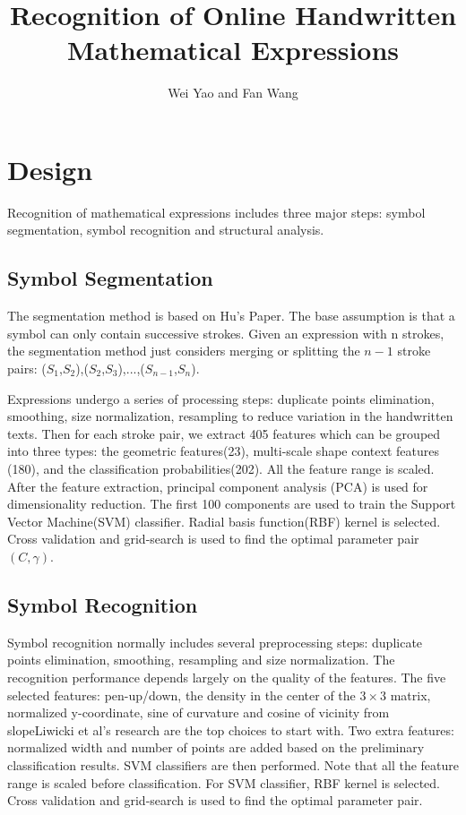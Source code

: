 \documentclass[]{spie}  %
\title{Recognition of Online Handwritten Mathematical Expressions}
\author{Wei Yao and Fan Wang
}
\begin{document}
\maketitle


\section{Design}

Recognition of mathematical expressions includes three major steps: symbol segmentation, symbol recognition and structural analysis.

\subsection{Symbol Segmentation}

The segmentation method is based on Hu's Paper\cite{Lei2013}. 
The base assumption is that a symbol can only contain successive strokes. 
Given an expression with n strokes, the segmentation method just considers merging or 
splitting the $n-1$ stroke pairs: ($S_1$,$S_2$),($S_2$,$S_3$),...,($S_{n-1}$,$S_{n}$).

Expressions  undergo a series of processing steps: duplicate points elimination, smoothing, 
size normalization, resampling to reduce variation in the handwritten 
texts\cite{Lei2011}\cite{Lei2013}. 
Then for each stroke pair, we extract 405 features which can be grouped into three types: the geometric features(23), multi-scale shape context features (180), and the classification probabilities(202). All the feature range is scaled. After the feature extraction, principal component analysis (PCA) is used for dimensionality reduction. The first 100 components are used to train the Support Vector Machine(SVM) classifier\cite{chang2011}. Radial basis function(RBF) kernel is selected. Cross validation and grid-search is used to find the optimal parameter pair $(C,\gamma)$.

\subsection{Symbol Recognition}

Symbol recognition normally includes several preprocessing steps: duplicate points elimination, smoothing, resampling and size normalization. The recognition performance depends largely on the quality of the features. The five selected features: pen-up/down, the density in the center of the $3\times 3$ matrix, normalized y-coordinate, sine of curvature and cosine of vicinity from slopeLiwicki et al's research\cite{Marcus2009} are the top choices to start with. Two extra features: normalized width and number of points are added based on the preliminary classification results. SVM classifiers are then performed. Note that all the feature range is scaled before classification. For SVM classifier, RBF kernel is selected. Cross validation and grid-search is used to find the optimal parameter pair.
\end{document}
